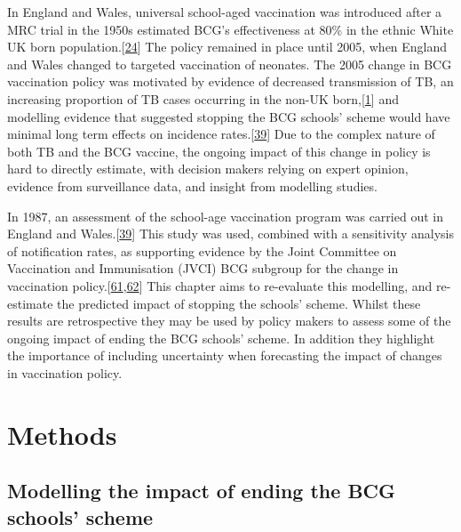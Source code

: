 \documentclass[11pt,twoside]{bristolthesis}
\begin{document}
  In England and Wales, universal school-aged vaccination was introduced after a MRC trial in the 1950s estimated BCG's effectiveness at 80\% in the ethnic White UK born population.{[}\protect\hyperlink{ref-Hart1972}{24}{]} The policy remained in place until 2005, when England and Wales changed to targeted vaccination of neonates. The 2005 change in BCG vaccination policy was motivated by evidence of decreased transmission of TB, an increasing proportion of TB cases occurring in the non-UK born,{[}\protect\hyperlink{ref-PHE2017}{1}{]} and modelling evidence that suggested stopping the BCG schools' scheme would have minimal long term effects on incidence rates.{[}\protect\hyperlink{ref-Sutherland1989}{39}{]} Due to the complex nature of both TB and the BCG vaccine, the ongoing impact of this change in policy is hard to directly estimate, with decision makers relying on expert opinion, evidence from surveillance data, and insight from modelling studies.
  
  In 1987, an assessment of the school-age vaccination program was carried out in England and Wales.{[}\protect\hyperlink{ref-Sutherland1989}{39}{]} This study was used, combined with a sensitivity analysis of notification rates, as supporting evidence by the Joint Committee on Vaccination and Immunisation (JVCI) BCG subgroup for the change in vaccination policy.{[}\protect\hyperlink{ref-JVCIBCG2002}{61},\protect\hyperlink{ref-JVCIBCG2003}{62}{]} This chapter aims to re-evaluate this modelling, and re-estimate the predicted impact of stopping the schools' scheme. Whilst these results are retrospective they may be used by policy makers to assess some of the ongoing impact of ending the BCG schools' scheme. In addition they highlight the importance of including uncertainty when forecasting the impact of changes in vaccination policy.
  
  \hypertarget{methods}{%
  \section{Methods}\label{methods}}
  
  \hypertarget{modelling-the-impact-of-ending-the-bcg-schools-scheme}{%
  \subsection{Modelling the impact of ending the BCG schools' scheme}\label{modelling-the-impact-of-ending-the-bcg-schools-scheme}}
  
\end{document}
